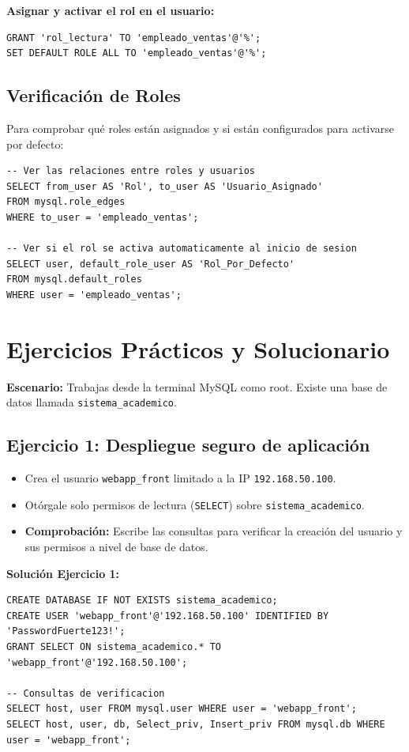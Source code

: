 \documentclass[12pt,a4paper]{article}
\begin{document}
\textbf{Asignar y activar el rol en el usuario:}
\begin{lstlisting}
GRANT 'rol_lectura' TO 'empleado_ventas'@'%';
SET DEFAULT ROLE ALL TO 'empleado_ventas'@'%';
\end{lstlisting}

\subsection*{ Verificación de Roles}
Para comprobar qué roles están asignados y si están configurados para activarse por defecto:
\begin{lstlisting}
-- Ver las relaciones entre roles y usuarios
SELECT from_user AS 'Rol', to_user AS 'Usuario_Asignado' 
FROM mysql.role_edges 
WHERE to_user = 'empleado_ventas';

-- Ver si el rol se activa automaticamente al inicio de sesion
SELECT user, default_role_user AS 'Rol_Por_Defecto' 
FROM mysql.default_roles 
WHERE user = 'empleado_ventas';
\end{lstlisting}

\newpage

\section{Ejercicios Prácticos y Solucionario}
\textbf{Escenario:} Trabajas desde la terminal MySQL como root. Existe una base de datos llamada \texttt{sistema\_academico}.

\subsection*{Ejercicio 1: Despliegue seguro de aplicación}
\begin{itemize}
    \item Crea el usuario \texttt{webapp\_front} limitado a la IP \texttt{192.168.50.100}.
    \item Otórgale solo permisos de lectura (\texttt{SELECT}) sobre \texttt{sistema\_academico}.
    \item \textbf{Comprobación:} Escribe las consultas para verificar la creación del usuario y sus permisos a nivel de base de datos.
\end{itemize}

\textbf{Solución Ejercicio 1:}
\begin{lstlisting}
CREATE DATABASE IF NOT EXISTS sistema_academico;
CREATE USER 'webapp_front'@'192.168.50.100' IDENTIFIED BY 'PasswordFuerte123!';
GRANT SELECT ON sistema_academico.* TO 'webapp_front'@'192.168.50.100';

-- Consultas de verificacion
SELECT host, user FROM mysql.user WHERE user = 'webapp_front';
SELECT host, user, db, Select_priv, Insert_priv FROM mysql.db WHERE user = 'webapp_front';
\end{lstlisting}
\end{document}
